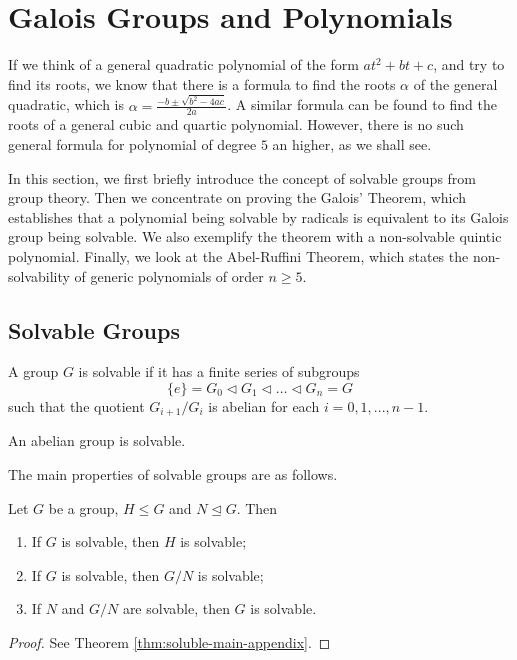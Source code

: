 \section{Galois Groups and Polynomials} \label{sec:galois-groups-and-polynomials}
If we think of a general quadratic polynomial of the form $at^2+bt+c$, and try to find its roots, we know that there is a formula to find the roots $\alpha$ of the general quadratic, which is $\alpha = \frac{-b \pm \sqrt{b^2 - 4ac}}{2a}$. A similar formula can be found to find the roots of a general cubic and quartic polynomial. However, there is no such general formula for polynomial of degree $5$ an higher, as we shall see. 

In this section, we first briefly introduce the concept of solvable groups from group theory. Then we concentrate on proving the Galois' Theorem, which establishes that a polynomial being solvable by radicals is equivalent to its Galois group being solvable. We also exemplify the theorem with a non-solvable quintic polynomial. Finally, we look at the Abel-Ruffini Theorem, which states the non-solvability of generic polynomials of order $n \ge 5$. 
\subsection{Solvable Groups}

\begin{definition} \label{def:soluble}
    A group $G$ is solvable if it has a finite series of subgroups 
    $$ \{ e \} = G_0 \triangleleft G_1 \triangleleft \dots \triangleleft G_n = G$$
    such that the quotient $G_{i+1} / G_{i}$ is abelian for each $i = 0, 1, ...,  n - 1$.
\end{definition}

\begin{observation}
    An abelian group is solvable. 
\end{observation}

The main properties of solvable groups are as follows. 

\begin{theorem} \label{thm:soluble-main}
    Let $G$ be a group, $H \le G$ and $N \trianglelefteq G$. Then 
    \begin{enumerate}[label=(\roman*)]
        \item If $G$ is solvable, then $H$ is solvable;
        \item If $G$ is solvable, then $G / N$ is solvable; 
        \item If $N$ and $G / N$ are solvable, then $G$ is solvable. 
    \end{enumerate}
\end{theorem}
\begin{proof}
	See Theorem \ref{thm:soluble-main-appendix}.
\end{proof}

